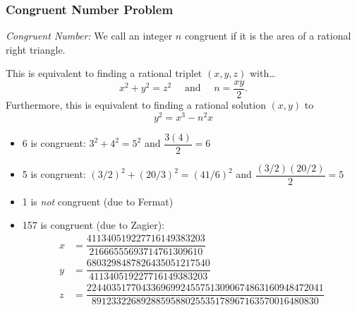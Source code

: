 \begin{frame} \frametitle{Congruent Number Problem}
\emph{Congruent Number:} We call an integer $n$ congruent if it is the area of a rational right triangle. \pspace

This is equivalent to finding a rational triplet $(x,y,z)$ with\dots
	\[
	x^2 + y^2= z^2 \quad \text{ and } \quad n= \dfrac{xy}{2}.
	\] \pspace
Furthermore, this is equivalent to finding a rational solution $(x,y)$ to
	\[
	y^2= x^3 - n^2 x
	\]
\end{frame}



\begin{frame}
\begin{ex}
\begin{itemize}
\small
\item 6 is congruent: $3^2 + 4^2= 5^2$ and $\dfrac{3(4)}{2}= 6$
\item 5 is congruent: $(3/2)^2 + (20/3)^2= (41/6)^2$ and $\dfrac{(3/2)(20/2)}{2}= 5$
\item 1 is \emph{not} congruent (due to Fermat) 
\item 157 is congruent (due to Zagier):
	\[
	\begin{aligned}
	x&= \dfrac{411340519227716149383203}{21666555693714761309610} \\
	y&= \dfrac{6803298487826435051217540}{411340519227716149383203} \\
	z&= \dfrac{224403517704336969924557513090674863160948472041}{8912332268928859588025535178967163570016480830}
	\end{aligned}
	\]
\end{itemize}
\end{ex}
\end{frame}





